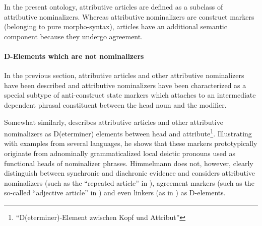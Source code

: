 In the present ontology, attributive articles are defined as a subclass of attributive nominalizers. Whereas attributive nominalizers are construct markers (belonging to pure morpho-syntax), articles have an additional semantic component because they undergo agreement. %

\paragraph*{D-Elements which are not nominalizers}
In the previous section, attributive articles and other attributive nominalizers have been described and attributive nominalizers have been characterized as a special subtype of anti\hyp{}construct state markers which attaches to an intermediate dependent phrasal constituent between the head noun and the modifier.

Somewhat similarly, \citet{himmelmann1997} describes attributive articles and other attributive nominalizers as D(eterminer) elements between head and attribute\footnote{“D(eterminer)-Element zwischen Kopf und Attribut”}. Illustrating  with examples from several languages, he shows that these markers prototypically originate from adnominally grammaticalized local deictic pronouns used as functional heads of nominalizer phrases. Himmelmann does not, however, clearly distinguish between synchronic and diachronic evidence and considers attributive nominalizers (such as the “repeated article” in ), agreement markers (such as the so-called “adjective article” in ) and even linkers (as in ) as D-elements.

